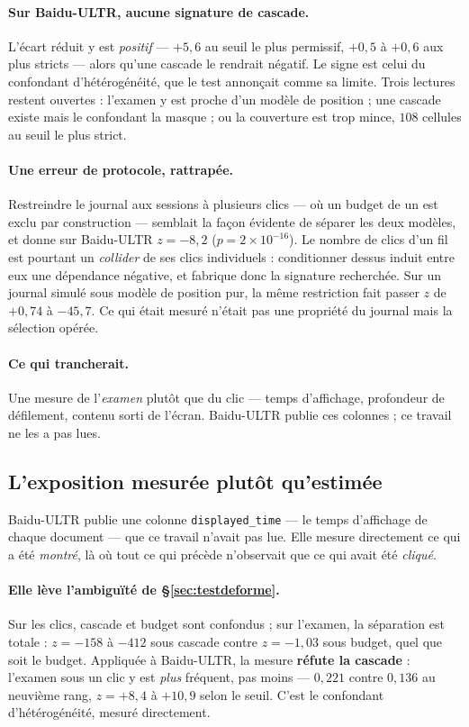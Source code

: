 \documentclass[11pt,a4paper]{article}
\begin{document}
\paragraph{Sur Baidu-ULTR, aucune signature de cascade.} L'écart réduit y est \emph{positif} ---
$+5{,}6$ au seuil le plus permissif, $+0{,}5$ à $+0{,}6$ aux plus stricts --- alors qu'une cascade
le rendrait négatif. Le signe est celui du confondant d'hétérogénéité, que le test annonçait comme
sa limite. Trois lectures restent ouvertes : l'examen y est proche d'un modèle de position ; une
cascade existe mais le confondant la masque ; ou la couverture est trop mince, $108$ cellules au
seuil le plus strict.

\paragraph{Une erreur de protocole, rattrapée.} Restreindre le journal aux sessions à plusieurs
clics --- où un budget de un est exclu par construction --- semblait la façon évidente de séparer
les deux modèles, et donne sur Baidu-ULTR $z = -8{,}2$ ($p = 2 \times 10^{-16}$). Le nombre de
clics d'un fil est pourtant un \emph{collider} de ses clics individuels : conditionner dessus
induit entre eux une dépendance négative, et fabrique donc la signature recherchée. Sur un journal
simulé sous modèle de position pur, la même restriction fait passer $z$ de $+0{,}74$ à $-45{,}7$.
Ce qui était mesuré n'était pas une propriété du journal mais la sélection opérée.

\paragraph{Ce qui trancherait.} Une mesure de l'\emph{examen} plutôt que du clic --- temps
d'affichage, profondeur de défilement, contenu sorti de l'écran. Baidu-ULTR publie ces colonnes ;
ce travail ne les a pas lues.


\subsection{L'exposition mesurée plutôt qu'estimée}
\label{sec:expositionmesuree}

Baidu-ULTR publie une colonne \texttt{displayed\_time} --- le temps d'affichage de chaque document
--- que ce travail n'avait pas lue. Elle mesure directement ce qui a été \emph{montré}, là où tout
ce qui précède n'observait que ce qui avait été \emph{cliqué}.

\paragraph{Elle lève l'ambiguïté de \S\ref{sec:testdeforme}.} Sur les clics, cascade et budget
sont confondus ; sur l'examen, la séparation est totale : $z = -158$ à $-412$ sous cascade contre
$z = -1{,}03$ sous budget, quel que soit le budget. Appliquée à Baidu-ULTR, la mesure \textbf{réfute
la cascade} : l'examen sous un clic y est \emph{plus} fréquent, pas moins --- $0{,}221$ contre
$0{,}136$ au neuvième rang, $z = +8{,}4$ à $+10{,}9$ selon le seuil. C'est le confondant
d'hétérogénéité, mesuré directement.
\end{document}
